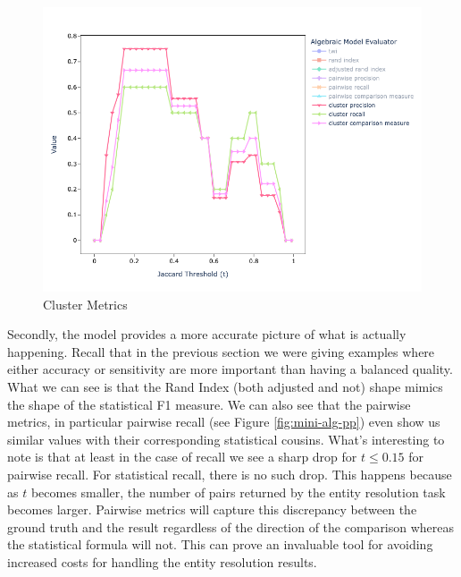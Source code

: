 \documentclass[11pt]{article}
\begin{document}
\begin{figure}
        \begin{minipage}{0.49\textwidth}
            \centering
            \includegraphics[width=\textwidth]{mini-alg-cp}
            \caption{Cluster Metrics}
            \label{fig:mini-alg-cp}
        \end{minipage}    
        
    \end{figure}\label{algebraic-prffig}

    Secondly, the model provides a more accurate picture of what is actually
    happening.
    Recall that in the previous section we were giving examples where either
    accuracy or sensitivity are more important than having a balanced quality.
    What we can see is that the Rand Index (both adjusted and not) shape mimics
    the shape of the statistical F1 measure.
    We can also see that the pairwise metrics, in particular pairwise recall (see Figure \ref{fig:mini-alg-pp}) 
    even show us similar values with their corresponding statistical cousins.
    What's interesting to note is that at least in the case of recall we see a
    sharp drop for $t \leq 0.15$ for pairwise recall.
    For statistical recall, there is no such drop.
    This happens because as $t$ becomes smaller, the number of pairs returned by
    the entity resolution task becomes larger.
    Pairwise metrics will capture this discrepancy between the ground truth and
    the result regardless of the direction of the comparison whereas the
    statistical formula will not.
    This can prove an invaluable tool for avoiding increased costs for handling
    the entity resolution results.
    
\end{document}
